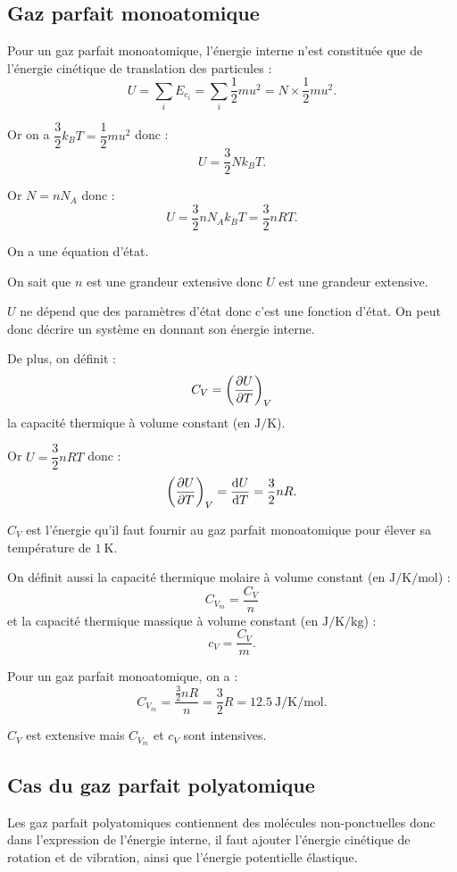 \subsection{Gaz parfait monoatomique}

Pour un gaz parfait monoatomique, l'énergie interne n'est constituée que de l'énergie cinétique de translation des particules : \[U=\sum_iE_{c_i}=\sum_i\dfrac{1}{2}mu^2=N\times\dfrac{1}{2}mu^2.\]

Or on a \(\dfrac{3}{2}k_BT=\dfrac{1}{2}mu^2\) donc : \[U=\dfrac{3}{2}Nk_BT.\]

Or \(N=nN_A\) donc : \[U=\dfrac{3}{2}nN_Ak_BT=\dfrac{3}{2}nRT.\]

On a une équation d'état.

On sait que \(n\) est une grandeur extensive donc \(U\) est une grandeur extensive.

\(U\) ne dépend que des paramètres d'état donc c'est une fonction d'état. On peut donc décrire un système en donnant son énergie interne.

De plus, on définit : \[C_V=\pdv{U}{T}_V\] la capacité thermique à volume constant (en \(\unit{\joule\per\kelvin}\)).

Or \(U=\dfrac{3}{2}nRT\) donc : \[\pdv{U}{T}_V=\odv{U}{T}=\dfrac{3}{2}nR.\]

\(C_V\) est l'énergie qu'il faut fournir au gaz parfait monoatomique pour élever sa température de \(\SI{1}{\kelvin}\).

On définit aussi la capacité thermique molaire à volume constant (en \(\unit{\joule\per\kelvin\per\mole}\)) : \[C_{V_m}=\dfrac{C_V}{n}\] et la capacité thermique massique à volume constant (en \(\unit{\joule\per\kelvin\per\kilo\gram}\)) : \[c_V=\dfrac{C_V}{m}.\]

Pour un gaz parfait monoatomique, on a : \[C_{V_m}=\dfrac{\frac{3}{2}nR}{n}=\dfrac{3}{2}R=\SI{12.5}{\joule\per\kelvin\per\mole}.\]

\(C_V\) est extensive mais \(C_{V_m}\) et \(c_V\) sont intensives.

\subsection{Cas du gaz parfait polyatomique}

Les gaz parfait polyatomiques contiennent des molécules non-ponctuelles donc dans l'expression de l'énergie interne, il faut ajouter l'énergie cinétique de rotation et de vibration, ainsi que l'énergie potentielle élastique.

